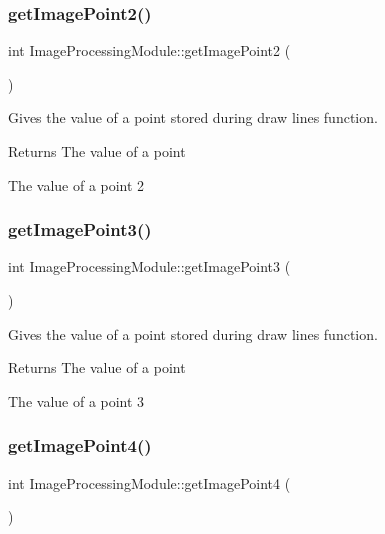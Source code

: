 \subsubsection{\texorpdfstring{get\+Image\+Point2()}{getImagePoint2()}}
{\footnotesize\ttfamily int Image\+Processing\+Module\+::get\+Image\+Point2 (\begin{DoxyParamCaption}{ }\end{DoxyParamCaption})}



Gives the value of a point stored during draw lines function. 

\begin{DoxyReturn}{Returns}
The value of a point

The value of a point 2 
\end{DoxyReturn}
\mbox{\label{class_image_processing_module_a7e09eceafa1f1955da80f2a73e0cae3d}} 
\subsubsection{\texorpdfstring{get\+Image\+Point3()}{getImagePoint3()}}
{\footnotesize\ttfamily int Image\+Processing\+Module\+::get\+Image\+Point3 (\begin{DoxyParamCaption}{ }\end{DoxyParamCaption})}



Gives the value of a point stored during draw lines function. 

\begin{DoxyReturn}{Returns}
The value of a point

The value of a point 3 
\end{DoxyReturn}
\mbox{\label{class_image_processing_module_ab9438399cb05c450d3cab12a9a513d45}} 
\subsubsection{\texorpdfstring{get\+Image\+Point4()}{getImagePoint4()}}
{\footnotesize\ttfamily int Image\+Processing\+Module\+::get\+Image\+Point4 (\begin{DoxyParamCaption}{ }\end{DoxyParamCaption})}



